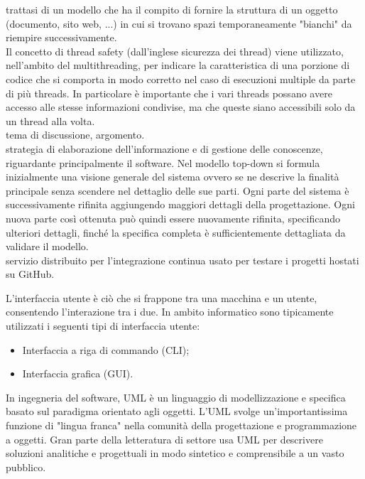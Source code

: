 \documentclass{scalatekids-article}
\begin{document}
   trattasi di un modello che ha il compito di fornire la struttura di un oggetto (documento, sito web, ...) in cui si trovano spazi temporaneamente "bianchi" da riempire successivamente.
  \\

   Il concetto di thread safety (dall'inglese sicurezza dei thread) viene utilizzato, nell'ambito del multithreading, per indicare la caratteristica di una porzione di codice che si comporta in modo corretto nel caso di esecuzioni multiple da parte di più threads. In particolare è importante che i vari threads possano avere accesso alle stesse informazioni condivise, ma che queste siano accessibili solo da un thread alla volta.
  \\

   tema di discussione, argomento.
  \\

   strategia di elaborazione dell'informazione e di gestione delle conoscenze, riguardante principalmente il software.
  Nel modello top-down si formula inizialmente una visione generale del sistema ovvero se ne descrive la finalità principale senza scendere nel dettaglio delle sue parti. Ogni parte del sistema è successivamente rifinita aggiungendo maggiori dettagli della progettazione. Ogni nuova parte così ottenuta può quindi essere nuovamente rifinita, specificando ulteriori dettagli, finché la specifica completa è sufficientemente dettagliata da validare il modello.
  \\

   servizio distribuito per l'integrazione continua usato per testare i progetti hostati su GitHub.
  \\


   L'interfaccia utente è ciò che si frappone tra una macchina e un utente, consentendo l'interazione tra i due. In ambito informatico sono tipicamente utilizzati i seguenti tipi di interfaccia utente:

  \begin{itemize}
  \item Interfaccia a riga di commando (CLI);
  \item Interfaccia grafica (GUI).
  \end{itemize}

   In ingegneria del software, UML è un linguaggio di modellizzazione e specifica basato sul paradigma orientato agli oggetti.
  L'UML svolge un'importantissima funzione di "lingua franca" nella comunità della progettazione e programmazione a oggetti. Gran parte della letteratura di settore usa UML per descrivere soluzioni analitiche e progettuali in modo sintetico e comprensibile a un vasto pubblico.
  \\
\end{document}

